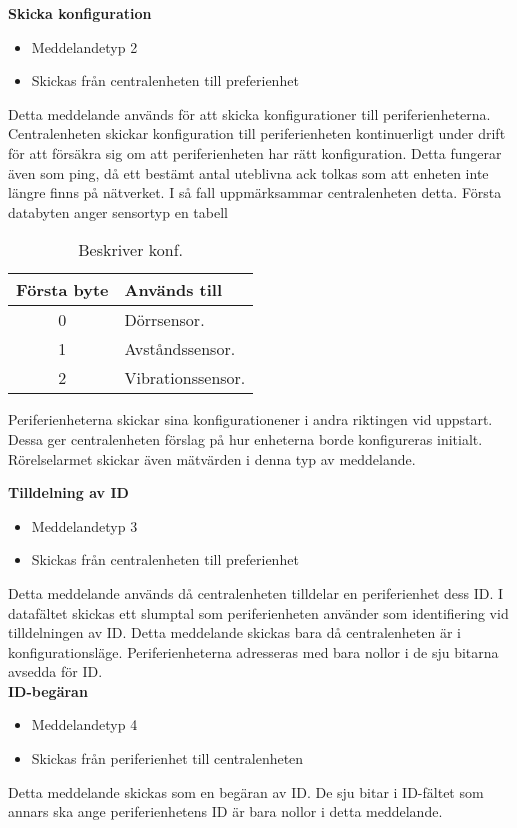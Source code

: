 \textbf{Skicka konfiguration}
\begin{itemize}
    \item Meddelandetyp 2
    \item Skickas från centralenheten till preferienhet
\end{itemize}
Detta meddelande används för att skicka konfigurationer till periferienheterna.
Centralenheten skickar konfiguration till periferienheten kontinuerligt under drift för att försäkra sig om att periferienheten har rätt konfiguration. Detta fungerar även som ping, då ett bestämt antal uteblivna ack tolkas som att enheten inte längre finns på nätverket.
I så fall uppmärksammar centralenheten detta.
Första databyten anger sensortyp en tabell
\begin{table}[H]
	\centering
	\begin{tabular}{|c|p{}|}
		\hline
		Första byte & Används till \\ \hline \hline
		0 & Dörrsensor. \\ \hline
		1 & Avståndssensor. \\ \hline
		2 & Vibrationssensor. \\ \hline

	\end{tabular}
	\caption{Beskriver konf.}
	\label{tab:konfsensors}
\end{table}


Periferienheterna skickar sina konfigurationener i andra riktingen vid uppstart.
Dessa ger centralenheten förslag på hur enheterna borde konfigureras initialt. Rörelselarmet skickar även mätvärden i denna typ av meddelande.


\textbf{Tilldelning av ID}
\begin{itemize}
    \item Meddelandetyp 3
    \item Skickas från centralenheten till preferienhet
\end{itemize}
Detta meddelande används då centralenheten tilldelar en periferienhet dess ID. I datafältet skickas ett slumptal som periferienheten använder som identifiering vid tilldelningen av ID. Detta meddelande skickas bara då centralenheten är i konfigurationsläge. Periferienheterna adresseras med bara nollor i de sju bitarna avsedda för ID. \\


\textbf{ID-begäran}
\begin{itemize}
    \item Meddelandetyp 4
    \item Skickas från periferienhet till centralenheten
\end{itemize}
Detta meddelande skickas som en begäran av ID. De sju bitar i ID-fältet som annars ska ange periferienhetens ID är bara nollor i detta meddelande.
